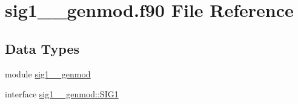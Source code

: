 \hypertarget{sig1____genmod_8f90}{\section{sig1\+\_\+\+\_\+genmod.\+f90 File Reference}
\label{sig1____genmod_8f90}
}
\subsection*{Data Types}
\begin{DoxyCompactItemize}
\item 
module \hyperlink{classsig1____genmod}{sig1\+\_\+\+\_\+genmod}
\item 
interface \hyperlink{interfacesig1____genmod_1_1SIG1}{sig1\+\_\+\+\_\+genmod\+::\+S\+I\+G1}
\end{DoxyCompactItemize}
